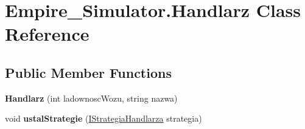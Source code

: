 \hypertarget{class_empire___simulator_1_1_handlarz}{\section{Empire\+\_\+\+Simulator.\+Handlarz Class Reference}
\label{class_empire___simulator_1_1_handlarz}
}
\subsection*{Public Member Functions}
\begin{DoxyCompactItemize}
\item 
\hypertarget{class_empire___simulator_1_1_handlarz_a7ea63718304e5484b7526e0e3f154941}{{\bfseries Handlarz} (int ladownosc\+Wozu, string nazwa)}\label{class_empire___simulator_1_1_handlarz_a7ea63718304e5484b7526e0e3f154941}

\item 
\hypertarget{class_empire___simulator_1_1_handlarz_a8b1f29aed34339e6136739184e4faa89}{void {\bfseries ustal\+Strategie} (\hyperlink{interface_empire___simulator_1_1_i_strategia_handlarza}{I\+Strategia\+Handlarza} strategia)}\label{class_empire___simulator_1_1_handlarz_a8b1f29aed34339e6136739184e4faa89}


\end{DoxyCompactItemize}

